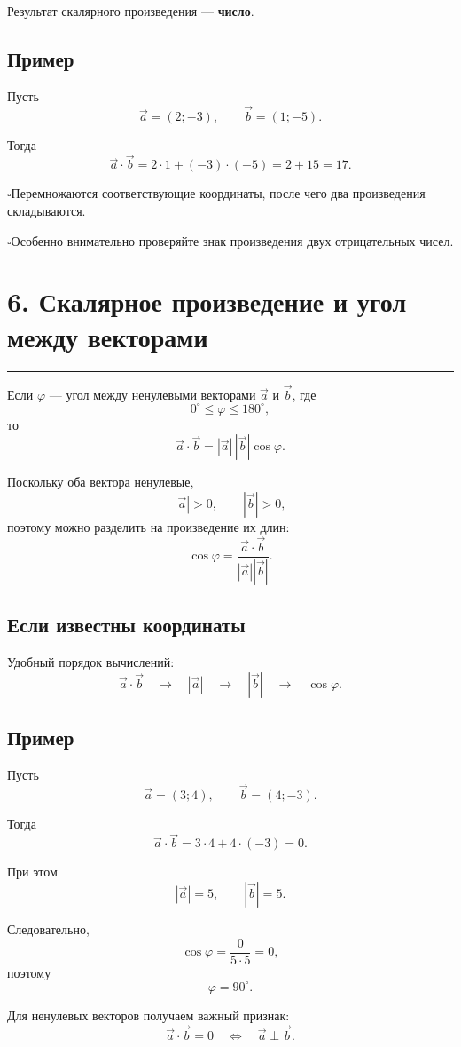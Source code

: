 \documentclass[a4paper,12pt]{article}
\newcommand{\vct}[1]{\vec{#1}}
\newcommand{\modv}[1]{\left|#1\right|}
\newcommand{\sectionline}{%
    \vspace{0.1em}
    {\color{accent}\rule{\linewidth}{0.6pt}}
    \vspace{0.3em}
}
\newcommand{\topic}[1]{%
    \Needspace{7\baselineskip}%
    \section*{\color{darkaccent}#1}
    \sectionline
}
\newcommand{\checkitem}[1]{%
    \par\noindent
    {\color{accent}\(\square\)}\;#1\par
}
\begin{document}
Результат скалярного произведения --- \textbf{число}.

\subsection*{\color{darkaccent}Пример}

Пусть
\[
\vct a=(2;-3),
\qquad
\vct b=(1;-5).
\]

Тогда
\[
\vct a\cdot\vct b
=
2\cdot1+(-3)\cdot(-5)
=
2+15
=
17.
\]

\checkitem{Перемножаются соответствующие координаты, после чего два произведения складываются.}

\checkitem{Особенно внимательно проверяйте знак произведения двух отрицательных чисел.}

\topic{6. Скалярное произведение и угол между векторами}

Если \(\varphi\) --- угол между ненулевыми векторами \(\vct a\) и \(\vct b\), где
\[
0^\circ\le\varphi\le180^\circ,
\]
то
\[
\boxed{
\vct a\cdot\vct b
=
\modv{\vct a}\,\modv{\vct b}\cos\varphi
}.
\]

Поскольку оба вектора ненулевые,
\[
\modv{\vct a}>0,
\qquad
\modv{\vct b}>0,
\]
поэтому можно разделить на произведение их длин:
\[
\boxed{
\cos\varphi
=
\frac{\vct a\cdot\vct b}
{\modv{\vct a}\modv{\vct b}}
}.
\]

\subsection*{\color{darkaccent}Если известны координаты}

Удобный порядок вычислений:
\[
\vct a\cdot\vct b
\quad\longrightarrow\quad
\modv{\vct a}
\quad\longrightarrow\quad
\modv{\vct b}
\quad\longrightarrow\quad
\cos\varphi.
\]

\subsection*{\color{darkaccent}Пример}

Пусть
\[
\vct a=(3;4),
\qquad
\vct b=(4;-3).
\]

Тогда
\[
\vct a\cdot\vct b
=
3\cdot4+4\cdot(-3)
=
0.
\]

При этом
\[
\modv{\vct a}=5,
\qquad
\modv{\vct b}=5.
\]

Следовательно,
\[
\cos\varphi
=
\frac{0}{5\cdot5}
=
0,
\]
поэтому
\[
\varphi=90^\circ.
\]

Для ненулевых векторов получаем важный признак:
\[
\boxed{
\vct a\cdot\vct b=0
\quad\Longleftrightarrow\quad
\vct a\perp\vct b
}.
\]
\end{document}
